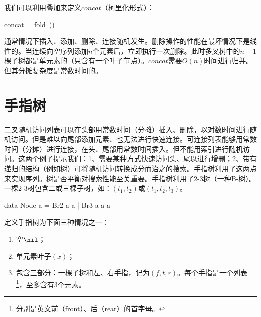 \documentclass[b5paper]{ctexart}
\begin{document}
我们可以利用叠加来定义$concat$（柯里化形式）：

\be
concat = fold\ (\doubleplus)\ \nil
\ee

通常情况下插入、添加、删除、连接随机发生。删除操作的性能在最坏情况下是线性的。当连续向空序列添加$n$个元素后，立即执行一次删除。此时多叉树中的$n-1$棵子树都是单元素的（只含有一个叶子节点）。$concat$需要$O(n)$时间进行归并。但其分摊复杂度是常数时间的。




\section{手指树}
 \label{sec:finger-tree}

二叉随机访问列表可以在头部用常数时间（分摊）插入、删除，以对数时间进行随机访问。但是难以向尾部添加元素、也无法进行快速连接。可连接列表能够用常数时间（分摊）进行连接，在头、尾部用常数时间插入。但不能用索引进行随机访问。这两个例子提示我们：1、需要某种方式快速访问头、尾以进行增删；2、带有递归的结构（例如树）可将随机访问转换成分而治之的搜索。手指树\cite{finger-tree-1977}利用了这两点来实现序列\cite{finger-tree-2006}。树是否平衡对搜索性能至关重要。手指树利用了2-3树（一种B-树）。一棵2-3树包含二或三棵子树，如：$(t_1, t_2)$或$(t_1, t_2, t_3)$。

\begin{Haskell}
data Node a = Br2 a a | Br3 a a a
\end{Haskell}

定义手指树为下面三种情况之一：

\begin{enumerate}
\item 空$\nil$；
\item 单元素叶子$(x)$；
\item 包含三部分：一棵子树和左、右手指，记为$(f, t, r)$。每个手指是一个列表\footnote{分别是英文前（front）、后（rear）的首字母。}，至多含有3个元素。
\end{enumerate}
\end{document}
